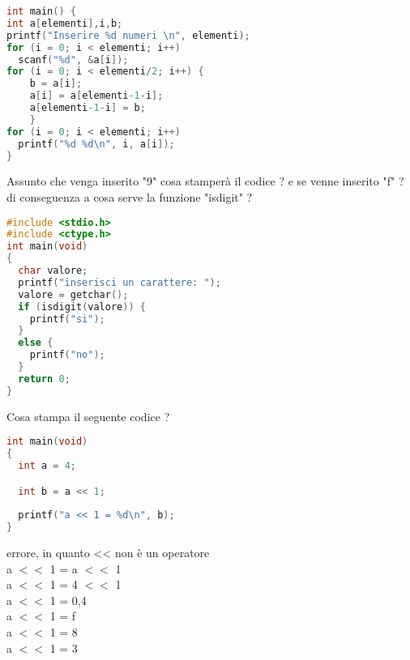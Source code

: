 \documentclass[addpoints,11pt]{exam}
\begin{document}
\begin{questions}
\begin{minipage}[t]{0.5\linewidth}
\begin{lstlisting}[language=C]
int main() { 
int a[elementi],i,b; 
printf("Inserire %d numeri \n", elementi); 
for (i = 0; i < elementi; i++) 
  scanf("%d", &a[i]); 
for (i = 0; i < elementi/2; i++) { 
    b = a[i]; 
    a[i] = a[elementi-1-i]; 
    a[elementi-1-i] = b; 
    } 
for (i = 0; i < elementi; i++) 
  printf("%d %d\n", i, a[i]); 
}
\end{lstlisting}
\end{minipage}
\begin{minipage}[t]{0.5\linewidth}
  \makeemptybox{180pt}
\end{minipage}


\question[2]
Assunto che venga inserito "9" cosa stamperà il codice ? e se venne inserito "f" ? di conseguenza a cosa serve la funzione "isdigit" ? \\
\begin{minipage}[t]{0.5\linewidth}
\begin{lstlisting}[language=C]
#include <stdio.h>
#include <ctype.h>
int main(void)
{
  char valore;
  printf("inserisci un carattere: ");
  valore = getchar();
  if (isdigit(valore)) {
    printf("si");
  }
  else {
    printf("no");
  }
  return 0;
}
\end{lstlisting}
\end{minipage}
\begin{minipage}[t]{0.5\linewidth}
  \makeemptybox{180pt}
\end{minipage}
\newpage

\question[3]
Cosa stampa il seguente codice ?

\begin{lstlisting}[language=C]
int main(void)
{
  int a = 4;

  int b = a << 1;
  
  printf("a << 1 = %d\n", b);
}
\end{lstlisting}
\begin{oneparcheckboxes}
	\choice errore, in quanto << non è un operatore\\
	\choice a $<<$ 1 = a $<<$ 1 \\
	\choice a $<<$ 1 = 4 $<<$ 1 \\
	\choice a $<<$ 1 = 0,4\\
	\choice a $<<$ 1 = f\\
	\choice a $<<$ 1 = 8\\
	\choice a $<<$ 1 = 3\\
\end{oneparcheckboxes}


\end{questions}
\end{document}
